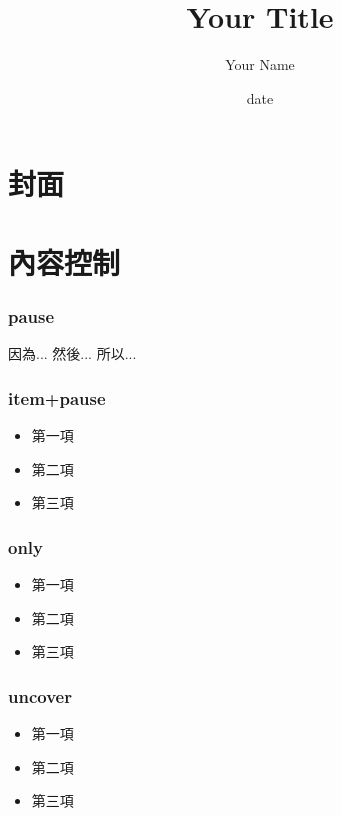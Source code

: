 \documentclass[xcolor=svgnames]{beamer}
\begin{document}
\title[Your Title\hspace{14em}\insertframenumber/\inserttotalframenumber]
{Your Title}

\author{Your Name}
\date{date}
\section{封面}
\begin{frame}
\titlepage
\end{frame}
\section{內容控制}
\begin{frame}
\frametitle{pause} %
因為...
\pause
然後...
\pause
所以...
\end{frame}
\begin{frame}
\frametitle{item+pause} %
\begin{itemize}
\item 第一項
\pause
\item 第二項
\pause
\item 第三項
\end{itemize}
\end{frame}
\begin{frame}
\frametitle{only} %
\begin{itemize}
\item<1-> 第一項
\item<2-> 第二項
\item<3-> 第三項
\end{itemize}
\end{frame}
\begin{frame}
\frametitle{uncover} %
\begin{itemize}
\item<1-> 第一項
\item<2-> 第二項
\item<3-> 第三項
\end{itemize}
\end{frame}
\end{document}
